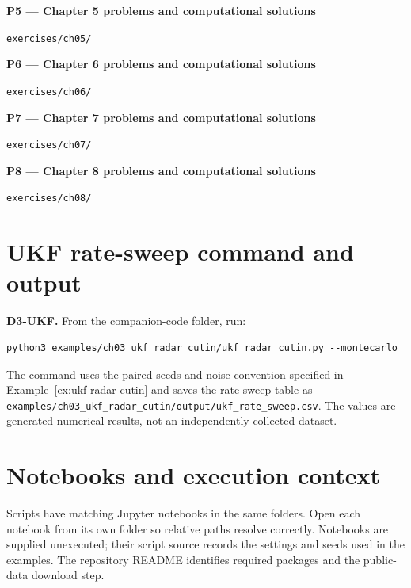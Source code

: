 \documentclass[graybox,envcountchap]{style/SNmono}
\newcommand{\repopath}[1]{\texttt{#1}}
\begin{document}
\par\medskip{}\label{code:P5}
\noindent\textbf{P5 --- Chapter 5 problems and computational solutions}\par
\noindent\repopath{exercises/\allowbreak ch05/\allowbreak }\par

\par\medskip{}\label{code:P6}
\noindent\textbf{P6 --- Chapter 6 problems and computational solutions}\par
\noindent\repopath{exercises/\allowbreak ch06/\allowbreak }\par

\par\medskip{}\label{code:P7}
\noindent\textbf{P7 --- Chapter 7 problems and computational solutions}\par
\noindent\repopath{exercises/\allowbreak ch07/\allowbreak }\par

\par\medskip{}\label{code:P8}
\noindent\textbf{P8 --- Chapter 8 problems and computational solutions}\par
\noindent\repopath{exercises/\allowbreak ch08/\allowbreak }\par

\section*{UKF rate-sweep command and output}
\label{code:D3-UKF}
\textbf{D3-UKF.} From the companion-code folder, run:
\begin{lstlisting}
python3 examples/ch03_ukf_radar_cutin/ukf_radar_cutin.py --montecarlo
\end{lstlisting}
The command uses the paired seeds and noise convention specified in Example~\ref{ex:ukf-radar-cutin} and saves the rate-sweep table as
\repopath{examples/\allowbreak ch03\_\allowbreak ukf\_\allowbreak radar\_\allowbreak cutin/\allowbreak output/\allowbreak ukf\_\allowbreak rate\_\allowbreak sweep.csv}.
The values are generated numerical results, not an independently collected dataset.

\section*{Notebooks and execution context}
Scripts have matching Jupyter notebooks in the same folders. Open each notebook from its own folder so relative paths resolve correctly. Notebooks are supplied unexecuted; their script source records the settings and seeds used in the examples. The repository README identifies required packages and the public-data download step.

\endgroup
\printindex
\end{document}
